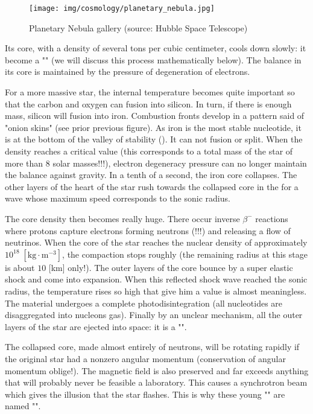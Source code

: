 	\begin{figure}[H]
		\begin{center}
		\texttt{[image: img/cosmology/planetary\_nebula.jpg]}
		\end{center}	
		\caption[Planetary Nebula gallery]{Planetary Nebula gallery (source: Hubble Space Telescope)}
	\end{figure}
	Its core, with a density of several tons per cubic centimeter, cools down slowly: it become a "" (we will discuss this process mathematically below). The balance in its core is maintained by the pressure of degeneration of electrons.
	
	For a more massive star, the internal temperature becomes quite important so that the carbon and oxygen can fusion into silicon. In turn, if there is enough mass, silicon will fusion into iron. Combustion fronts develop in a pattern said of "onion skins" (see prior previous figure). As iron is the most stable nucleotide,  it is at the bottom of the valley of stability (). It can not fusion or split. When the density reaches a critical value (this corresponds to a total mass of the star of more than $8$ solar masses!!!), electron degeneracy pressure can no longer maintain the balance against gravity. In a tenth of a second, the iron core collapses. The other layers of the heart of the star rush towards the collapsed core in the for a wave whose maximum speed corresponds to the sonic radius.
	
	The core density then becomes really huge. There occur inverse $\beta^-$ reactions where protons capture electrons forming neutrons (!!!) and releasing a flow of neutrinos. When the core of the star reaches the nuclear density of approximately $10^{18}\;[\text{kg}\cdot\text{m}^{-3}]$, the compaction stops roughly (the remaining radius at this stage is about $10$ [km] only!). The outer layers of the core bounce by a super elastic shock and come into expansion. When this reflected shock wave reached the sonic radius, the temperature rises so high that give him a value is almost meaningless. The material undergoes a complete photodisintegration (all nucleotides are disaggregated into nucleons gas). Finally by an unclear mechanism, all the outer layers of the star are ejected into space: it is a "".
	
	The collapsed core, made almost entirely of neutrons, will be rotating rapidly if the original star had a nonzero angular momentum (conservation of angular momentum oblige!). The magnetic field is also preserved and far exceeds anything that will probably never be feasible a laboratory. This causes a synchrotron beam which gives the illusion that the star flashes. This is why these young "" are named "".
	
